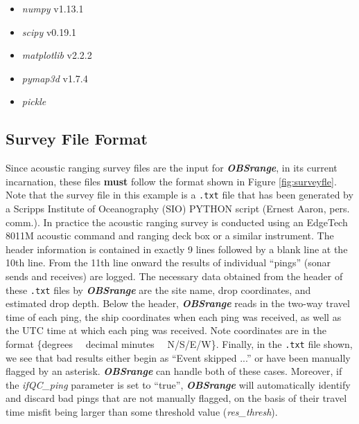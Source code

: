 \documentclass[titlepage, 12pt]{article}
\begin{document}
  \begin{itemize}
   \item \textit{numpy} v1.13.1
   \item \textit{scipy} v0.19.1
   \item \textit{matplotlib} v2.2.2
   \item \textit{pymap3d} v1.7.4
   \item \textit{pickle}
  \end{itemize}

  \subsection{Survey File Format}
  Since acoustic ranging survey files are the input for \textit{\textbf{OBSrange}}, in its current incarnation, these files \textbf{must} follow the format shown in Figure \ref{fig:surveyfle}. Note that the survey file in this example is a \texttt{.txt} file that has been generated by a Scripps Institute of Oceanography (SIO) PYTHON script (Ernest Aaron, pers. comm.). In practice the acoustic ranging survey is conducted using an EdgeTech 8011M acoustic command and ranging deck box or a similar instrument. The header information is contained in exactly 9 lines followed by a blank line at the 10th line. From the 11th line onward the results of individual “pings” (sonar sends and receives) are logged. The necessary data obtained from the header of these \texttt{.txt} files by \textit{\textbf{OBSrange}} are the site name, drop coordinates, and estimated drop depth. Below the header, \textit{\textbf{OBSrange}} reads in the two-way travel time of each ping, the ship coordinates when each ping was received, as well as the UTC time at which each ping was received. Note coordinates are in the format \{degrees~~ decimal minutes~~ N/S/E/W\}. Finally, in the \texttt{.txt} file shown, we see that bad results either begin as ``Event skipped ...'' or have been manually flagged by an asterisk. \textit{\textbf{OBSrange}} can handle both of these cases. Moreover, if the \textit{ifQC\_ping} parameter is set to ``true'', \textit{\textbf{OBSrange}} will automatically identify and discard bad pings that are not manually flagged, on the basis of their travel time misfit being larger than some threshold value (\textit{res\_thresh}). 
\end{document}
